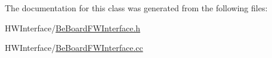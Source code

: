 The documentation for this class was generated from the following files\-:\begin{DoxyCompactItemize}
\item 
H\-W\-Interface/\hyperlink{_be_board_f_w_interface_8h}{Be\-Board\-F\-W\-Interface.\-h}\item 
H\-W\-Interface/\hyperlink{_be_board_f_w_interface_8cc}{Be\-Board\-F\-W\-Interface.\-cc}\end{DoxyCompactItemize}
